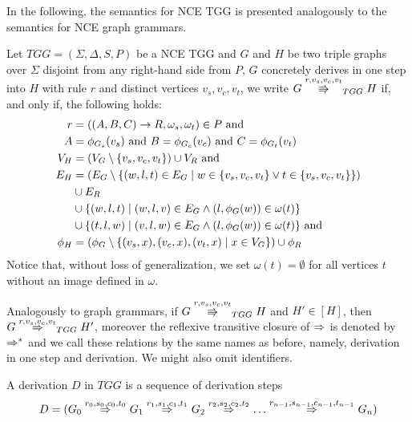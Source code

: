 \documentclass[]{report}
\begin{document}
In the following, the semantics for NCE TGG is presented analogously to the semantics for NCE graph grammars.

\begin{definition}
	Let $TGG = (\Sigma, \Delta, S, P)$ be a NCE TGG and $G$ and $H$ be two triple graphs over $\Sigma$ disjoint from any right-hand side from $P$, $G$ concretely derives in one step into $H$ with rule $r$ and distinct vertices $v_s, v_c, v_t$, we write $G \tcderiv{r}{v_s,v_c,v_t}{TGG} H$ if, and only if, the following holds:
	\begin{align*}
	r & = ((A,B,C) \to R, \omega_s, \omega_t) \in P \text{ and } \\
	A & = \phi_{G_s}(v_s) \text{ and } B = \phi_{G_c}(v_c) \text{ and } C = \phi_{G_t}(v_t)\\
	V_H  & = (V_G \setminus \{v_s,v_c,v_t\}) \cup V_R \text{ and}\\
	E_H & = (E_G \setminus \{(w,l,t) \in E_G \; | \; w \in \{v_s,v_c,v_t\} \lor t \in \{v_s,v_c,v_t\} \})  \\
	& \cup E_R \\
	& \cup \{(w,l,t) \; | \; (w,l,v) \in E_G \land (l,\phi_G(w)) \in \omega(t)\} \\
	& \cup \{(t,l,w) \; | \; (v,l,w) \in E_G \land (l,\phi_G(w)) \in \omega(t)\} \text{ and} \\
	\phi_H & = (\phi_G \setminus \{(v_s,x),(v_c,x),(v_t,x) \; | \; x \in V_G\}) \cup \phi_R
	\end{align*}
	Notice that, without loss of generalization, we set $\omega(t) = \emptyset$ for all vertices $t$ without an image defined in $\omega$.
	
	Analogously to graph grammars, if $G \cderiv{r}{v_s,v_c,v_t}{TGG} H$ and $H' \in [H]$, then $G \tderiv{r}{v_s,v_c,v_t}{TGG} H'$, moreover the reflexive transitive closure of $\tderiv{}{}{}$ is denoted by $\tderivtr{}{}{}$ and we call these relations by the same names as before, namely, derivation in one step and derivation. We might also omit identifiers.
\end{definition}


\begin{definition}
	A derivation $D$ in $TGG$ is a sequence of derivation steps
	\[ 
	D = (G_0 \tderiv{r_0}{s_0,c_0,t_0}{} G_1 \tderiv{r_1}{s_1,c_1,t_1}{} G_2 \tderiv{r_2}{s_2,c_2,t_2}{} \dots \tderiv{r_{n-1}}{s_{n-1},c_{n-1},t_{n-1}}{} G_n)
	\]
\end{definition}
\end{document}
